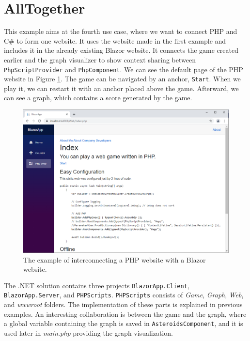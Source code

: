 \section{AllTogether}

This example aims at the fourth use case, where we want to connect PHP and C\# to form one website.
It uses the website made in the first example and includes it in the already existing Blazor website.
It connects the game created earlier and the graph visualizer to show context sharing between \texttt{PhpScriptProvider} and \texttt{PhpComponent}.
We can see the default page of the PHP website in Figure \ref{img30:allTogether}.
The game can be navigated by an anchor, \texttt{Start}.
When we play it, we can restart it with an anchor placed above the game.
Afterward, we can see a graph, which contains a score generated by the game. 
\par
\begin{figure}[b!]
\centering
\includegraphics[scale=0.5]{./img/AllTogether}
\caption{The example of interconnecting a PHP website with a Blazor website.}
\label{img30:allTogether}
\end{figure} 
\par
The .NET solution contains three projects \texttt{BlazorApp.Client}, \texttt{BlazorApp\-.Server}, and \texttt{PHPScripts}.
\texttt{PHPScripts} consists of \textit{Game}, \textit{Graph}, \textit{Web}, and \textit{wwwroot} folders.
The implementation of these parts is explained in previous examples.
An interesting collaboration is between the game and the graph, where a global variable containing the graph is saved in \texttt{AsteroidsComponent}, and it is used later in \textit{main.php} providing the graph visualization.
